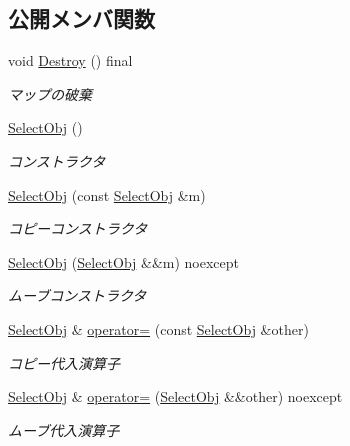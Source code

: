 \subsection*{公開メンバ関数}
\begin{DoxyCompactItemize}
\item 
void \mbox{\hyperlink{class_select_obj_ad3a5fdc41a9e5753f99bae7ad289888f}{Destroy}} () final
\begin{DoxyCompactList}\small\item\em マップの破棄 \end{DoxyCompactList}\item 
\mbox{\hyperlink{class_select_obj_a38e6ecf0bc37abe109332de38c027853}{Select\+Obj}} ()
\begin{DoxyCompactList}\small\item\em コンストラクタ \end{DoxyCompactList}\item 
\mbox{\hyperlink{class_select_obj_ab62679ab8ef5831c5389fdb234b37188}{Select\+Obj}} (const \mbox{\hyperlink{class_select_obj}{Select\+Obj}} \&m)
\begin{DoxyCompactList}\small\item\em コピーコンストラクタ \end{DoxyCompactList}\item 
\mbox{\hyperlink{class_select_obj_a5d1e7d1696dfdef2eadf25cb4166f2ef}{Select\+Obj}} (\mbox{\hyperlink{class_select_obj}{Select\+Obj}} \&\&m) noexcept
\begin{DoxyCompactList}\small\item\em ムーブコンストラクタ \end{DoxyCompactList}\item 
\mbox{\hyperlink{class_select_obj}{Select\+Obj}} \& \mbox{\hyperlink{class_select_obj_a6faf6b5fed9a6a61f24d1c91e009d0c7}{operator=}} (const \mbox{\hyperlink{class_select_obj}{Select\+Obj}} \&other)
\begin{DoxyCompactList}\small\item\em コピー代入演算子 \end{DoxyCompactList}\item 
\mbox{\hyperlink{class_select_obj}{Select\+Obj}} \& \mbox{\hyperlink{class_select_obj_a31f75f0dc6f8fb01f577bc8e5d4099f8}{operator=}} (\mbox{\hyperlink{class_select_obj}{Select\+Obj}} \&\&other) noexcept
\begin{DoxyCompactList}\small\item\em ムーブ代入演算子 \end{DoxyCompactList}\item 

\end{DoxyCompactItemize}
